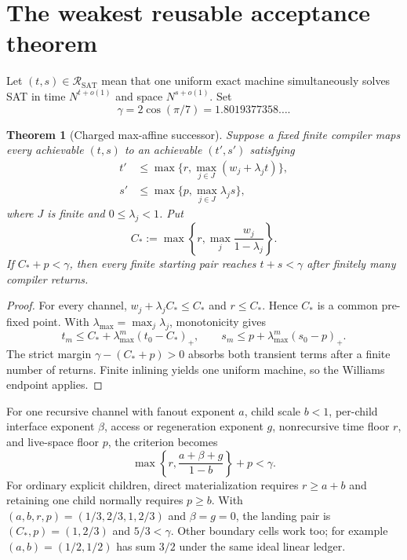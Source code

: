 \documentclass[11pt]{article}
\newtheorem{theorem}{Theorem}[section]
\newcommand{\SAT}{\operatorname{SAT}}
\newcommand{\R}{\mathcal R_{\SAT}}
\begin{document}
\section{The weakest reusable acceptance theorem}
\label{sec:maxaffine}

Let $(t,s)\in\R$ mean that one uniform exact machine simultaneously solves
SAT in time $N^{t+o(1)}$ and space $N^{s+o(1)}$.  Set
\[
 \gamma=2\cos(\pi/7)=1.8019377358\ldots.
\]

\begin{theorem}[Charged max-affine successor]
Suppose a fixed finite compiler maps every achievable $(t,s)$ to an
achievable $(t',s')$ satisfying
\begin{align*}
 t'&\le \max\{r,\max_{j\in J}(w_j+\lambda_jt)\},\\
 s'&\le \max\{p,\max_{j\in J}\lambda_js\},
\end{align*}
where $J$ is finite and $0\le\lambda_j<1$.  Put
\[
 C_*:=\max\left\{r,\max_j\frac{w_j}{1-\lambda_j}\right\}.
\]
If $C_*+p<\gamma$, then every finite starting pair reaches
$t+s<\gamma$ after finitely many compiler returns.
\end{theorem}

\begin{proof}
For every channel, $w_j+\lambda_jC_*\le C_*$ and $r\le C_*$.  Hence $C_*$
is a common pre-fixed point.  With
$\lambda_{\max}=\max_j\lambda_j$, monotonicity gives
\[
 t_m\le C_*+\lambda_{\max}^m(t_0-C_*)_+,
 \qquad
 s_m\le p+\lambda_{\max}^m(s_0-p)_+.
\]
The strict margin $\gamma-(C_*+p)>0$ absorbs both transient terms after a
finite number of returns.  Finite inlining yields one uniform machine, so the
Williams endpoint applies.
\end{proof}

For one recursive channel with fanout exponent $a$, child scale $b<1$,
per-child interface exponent $\beta$, access or regeneration exponent $g$,
nonrecursive time floor $r$, and live-space floor $p$, the criterion becomes
\begin{equation*}
 \boxed{
 \max\left\{r,\frac{a+\beta+g}{1-b}\right\}+p<\gamma.}
 \tag{A}
\end{equation*}
For ordinary explicit children, direct materialization requires
$r\ge a+b$ and retaining one child normally requires $p\ge b$.  With
$(a,b,r,p)=(1/3,2/3,1,2/3)$ and $\beta=g=0$, the landing pair is
$(C_*,p)=(1,2/3)$ and $5/3<\gamma$.  Other boundary cells work too; for
example $(a,b)=(1/2,1/2)$ has sum $3/2$ under the same ideal linear ledger.
\end{document}
